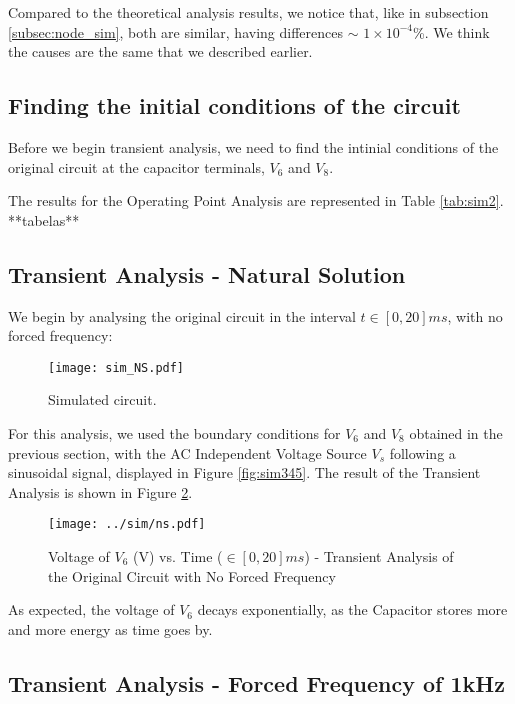 Compared to the theoretical analysis results, we notice that, like in subsection \ref{subsec:node_sim}, both are similar, having differences $\sim$ $1\times10^{-4}$\%. We think the causes are the same that we described earlier.

\subsection{Finding the initial conditions of the circuit}
\label{subsec:init_conds}

Before we begin transient analysis, we need to find the intinial conditions of the original circuit at the capacitor terminals, $V_6$ and $V_8$.
\par
The results for the Operating Point Analysis are represented in Table \ref{tab:sim2}.
**tabelas**

\subsection{Transient Analysis - Natural Solution}
\label{subsec:trans_NS}

We begin by  analysing the original circuit in the interval $t \in [0, 20]ms$, with no forced frequency:

\begin{figure}[H] \centering
\texttt{[image: sim\_NS.pdf]}
\caption{Simulated circuit.}
\label{fig:sim_NS}
\end{figure}

For this analysis, we used the boundary conditions for $V_6$ and $V_8$ obtained in the previous section, with the AC Independent Voltage Source $V_s$ following a sinusoidal signal, displayed in Figure \ref{fig:sim345}. The result of the Transient Analysis is shown in Figure \ref{fig:sim-graph3}.

\begin{figure}[H] \centering
\texttt{[image: ../sim/ns.pdf]}
\caption{Voltage of $V_6$ (V) vs. Time ($\in [0, 20]ms$) - Transient Analysis of the Original Circuit with No Forced Frequency}
\label{fig:sim-graph3}
\end{figure}

As expected, the voltage of $V_6$ decays exponentially, as the Capacitor stores more and more energy as time goes by.

\subsection{Transient Analysis - Forced Frequency of 1kHz}
\label{subsec:trans_FS}

